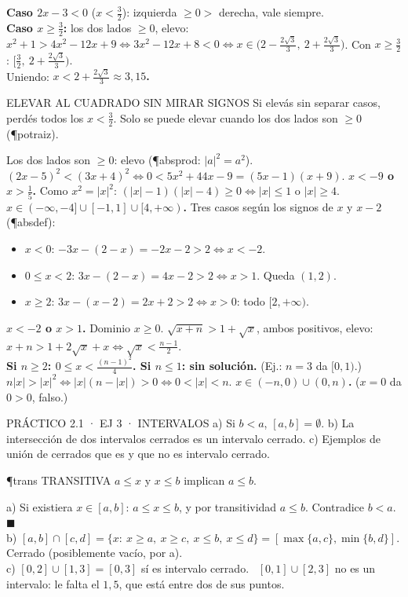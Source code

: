 \textbf{Caso $2x-3<0$} ($x<\frac32$): izquierda $\ge0>$ derecha, vale siempre.\\
\textbf{Caso $x\ge\frac32$:} los dos lados $\ge0$, elevo: $x^2+1>4x^2-12x+9\iff3x^2-12x+8<0\iff x\in\big(2-\frac{2\sqrt3}3,\ 2+\frac{2\sqrt3}3\big)$. Con $x\ge\frac32$: $[\frac32,\ 2+\frac{2\sqrt3}3)$.\\
Uniendo: \textbf{$x<2+\frac{2\sqrt3}3\approx3{,}15$.}
\begin{trampa}{ELEVAR AL CUADRADO SIN MIRAR SIGNOS}
Si elevás sin separar casos, perdés todos los $x<\frac32$. Solo se puede elevar cuando los dos lados son $\ge0$ (\P{potraiz}).
\end{trampa}
Los dos lados son $\ge0$: elevo (\P{absprod}: $|a|^2=a^2$). $(2x-5)^2<(3x+4)^2\iff0<5x^2+44x-9=(5x-1)(x+9)$. \textbf{$x<-9$ o $x>\frac15$.}
Como $x^2=|x|^2$: $(|x|-1)(|x|-4)\ge0\iff|x|\le1$ o $|x|\ge4$. \textbf{$x\in(-\infty,-4]\cup[-1,1]\cup[4,+\infty)$.}
Tres casos según los signos de $x$ y $x-2$ (\P{absdef}):
\begin{itemize}
\item $x<0$: $-3x-(2-x)=-2x-2>2\iff x<-2$.
\item $0\le x<2$: $3x-(2-x)=4x-2>2\iff x>1$. Queda $(1,2)$.
\item $x\ge2$: $3x-(x-2)=2x+2>2\iff x>0$: todo $[2,+\infty)$.
\end{itemize}
\textbf{$x<-2$ o $x>1$.}
Dominio $x\ge0$. $\sqrt{x+n}>1+\sqrt x$, ambos positivos, elevo: $x+n>1+2\sqrt x+x\iff\sqrt x<\frac{n-1}2$.\\
\textbf{Si $n\ge2$: $0\le x<\frac{(n-1)^2}4$. Si $n\le1$: sin solución.} (Ej.: $n=3$ da $[0,1)$.)
$n|x|>|x|^2\iff|x|(n-|x|)>0\iff0<|x|<n$. \textbf{$x\in(-n,0)\cup(0,n)$.} ($x=0$ da $0>0$, falso.)

\begin{enunciado}{PRÁCTICO 2.1 · EJ 3 · INTERVALOS}
a) Si $b<a$, $[a,b]=\emptyset$. b) La intersección de dos intervalos cerrados es un intervalo cerrado. c) Ejemplos de unión de cerrados que es y que no es intervalo cerrado.
\end{enunciado}
\begin{uso}{\P{trans} TRANSITIVA}
$a\le x$ y $x\le b$ implican $a\le b$.
\end{uso}
a) Si existiera $x\in[a,b]$: $a\le x\le b$, y por transitividad $a\le b$. Contradice $b<a$. $\blacksquare$\\
b) $[a,b]\cap[c,d]=\{x:\ x\ge a,\ x\ge c,\ x\le b,\ x\le d\}=[\max\{a,c\},\min\{b,d\}]$. Cerrado (posiblemente vacío, por a).\\
c) $[0,2]\cup[1,3]=[0,3]$ sí es intervalo cerrado. \ $[0,1]\cup[2,3]$ no es un intervalo: le falta el $1{,}5$, que está entre dos de sus puntos.

